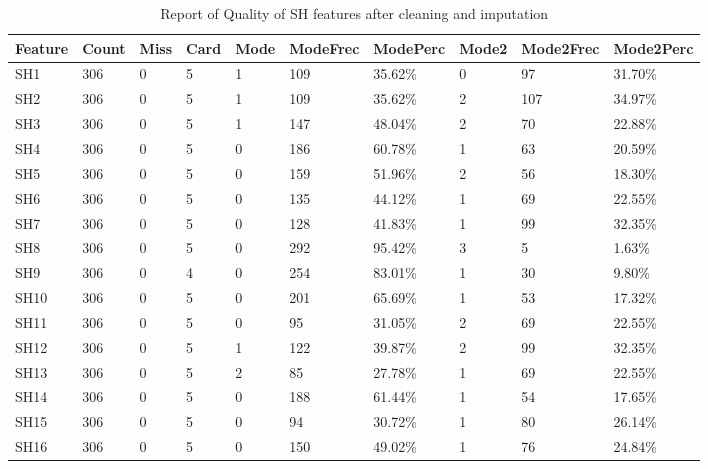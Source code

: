 \documentclass[]{book}
\begin{document}
\begin{table}[ht]
\centering
\caption{Report of Quality of SH features after cleaning and imputation}
\label{tab-report-of-quality-of-sh-features}
\begin{tabular}{|l|l|l|l|l|l|l|l|l|l|}
\hline
Feature & Count & Miss & Card & Mode & ModeFrec & ModePerc & Mode2 & Mode2Frec & Mode2Perc \\ \hline
SH1     & 306   & 0    & 5    & 1    & 109      & 35.62\%  & 0     & 97        & 31.70\%   \\ \hline
SH2     & 306   & 0    & 5    & 1    & 109      & 35.62\%  & 2     & 107       & 34.97\%   \\ \hline
SH3     & 306   & 0    & 5    & 1    & 147      & 48.04\%  & 2     & 70        & 22.88\%   \\ \hline
SH4     & 306   & 0    & 5    & 0    & 186      & 60.78\%  & 1     & 63        & 20.59\%   \\ \hline
SH5     & 306   & 0    & 5    & 0    & 159      & 51.96\%  & 2     & 56        & 18.30\%   \\ \hline
SH6     & 306   & 0    & 5    & 0    & 135      & 44.12\%  & 1     & 69        & 22.55\%   \\ \hline
SH7     & 306   & 0    & 5    & 0    & 128      & 41.83\%  & 1     & 99        & 32.35\%   \\ \hline
SH8     & 306   & 0    & 5    & 0    & 292      & 95.42\%  & 3     & 5         & 1.63\%    \\ \hline
SH9     & 306   & 0    & 4    & 0    & 254      & 83.01\%  & 1     & 30        & 9.80\%    \\ \hline
SH10    & 306   & 0    & 5    & 0    & 201      & 65.69\%  & 1     & 53        & 17.32\%   \\ \hline
SH11    & 306   & 0    & 5    & 0    & 95       & 31.05\%  & 2     & 69        & 22.55\%   \\ \hline
SH12    & 306   & 0    & 5    & 1    & 122      & 39.87\%  & 2     & 99        & 32.35\%   \\ \hline
SH13    & 306   & 0    & 5    & 2    & 85       & 27.78\%  & 1     & 69        & 22.55\%   \\ \hline
SH14    & 306   & 0    & 5    & 0    & 188      & 61.44\%  & 1     & 54        & 17.65\%   \\ \hline
SH15    & 306   & 0    & 5    & 0    & 94       & 30.72\%  & 1     & 80        & 26.14\%   \\ \hline
SH16    & 306   & 0    & 5    & 0    & 150      & 49.02\%  & 1     & 76        & 24.84\%   \\ \hline

\end{tabular}
\end{table}
\end{document}
